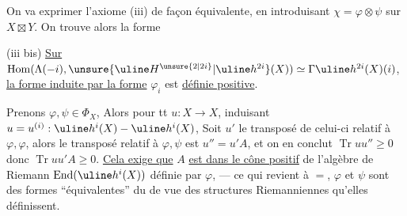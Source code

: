 On va exprimer l'axiome (iii) de façon équivalente,
en introduisant $\chi=\varphi\otimes\psi$ sur $X\boxtimes Y$.
On trouve alors
la forme

(iii bis) \uline{Sur} 
$\operatorname{Hom}(\Lambda(-i),\unsure{\uline H^{\unsure{2|2i}}|\uline h^{2i}}(X))
\simeq\Gamma\uline h^{2i}(X)(i)$,
\uline{la forme induite par la forme} $\varphi_i$ est \uline{définie positive}.


Prenons $\varphi,\psi\in\Phi_X$,
Alors pour tt $u:X\longrightarrow X$, induisant
$u=u^{(i)}:\uline h^i(X)\mathbin{-}\uline h^i(X)$,
Soit $u'$ le transposé de celui-ci relatif à $\varphi,\varphi$,
alors le transposé relatif à $\varphi,\psi$ est $u''=u'A$,
et on en conclut $\operatorname{Tr}uu''\geq0$ donc $\operatorname{Tr}uu'A\geq0$.
\uline{Cela exige que} $A$ \uline{est dans le cône positif}
de l'algèbre  de Riemann
$\operatorname{End}(\uline h^i(X))$ définie par $\varphi$, --- ce qui
revient à $=$, $\varphi$ et $\psi$ sont des formes
``équivalentes'' du  de vue des structures
Riemanniennes qu'elles définissent.
